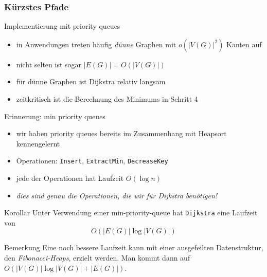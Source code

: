 \documentclass[aspectratio=1610, 11pt]{beamer}
\newcommand{\mytitle}{K\"urzstes Pfade}
\begin{document}
\begin{frame}\frametitle{\mytitle}
	\begin{overprint}
		\begin{exampleblock}{Implementierung mit priority queues}
			\begin{itemize}
				\item in Anwendungen treten h\"aufig {\em d\"unne} Graphen mit $o(|V(G)|^2)$ Kanten auf
				\item  nicht selten ist sogar $|E(G)|=O(|V(G)|)$
				\item f\"ur d\"unne Graphen ist Dijkstra relativ langsam
				\item zeitkritisch ist die Berechnung des Minimums in Schritt 4
			\end{itemize}
		\end{exampleblock}
		\begin{exampleblock}{Erinnerung: min priority queues}
			\begin{itemize}
				\item wir haben priority queues bereits im Zusammenhang mit Heapsort kennengelernt
				\item Operationen: {\tt Insert}, {\tt ExtractMin}, {\tt DecreaseKey}
				\item jede der Operationen hat Laufzeit $O(\log n)$
				\item \itshape dies sind genau die Operationen, die wir f\"ur Dijkstra ben\"otigen!
			\end{itemize}
		\end{exampleblock}
		\begin{block}{Korollar}
			Unter Verwendung einer min-priority-queue hat {\tt Dijkstra} eine Laufzeit von $$O(|E(G)|\log|V(G)|)$$
		\end{block}
		\begin{exampleblock}{Bemerkung}
			Eine noch bessere Laufzeit kann mit einer ausgefeilten Datenstruktur, den {\em Fibonacci-Heaps}, erzielt werden.
			Man kommt dann auf $O(|V(G)|\log|V(G)|+|E(G)|)$.
		\end{exampleblock}
	\end{overprint}
\end{frame}
\end{document}
